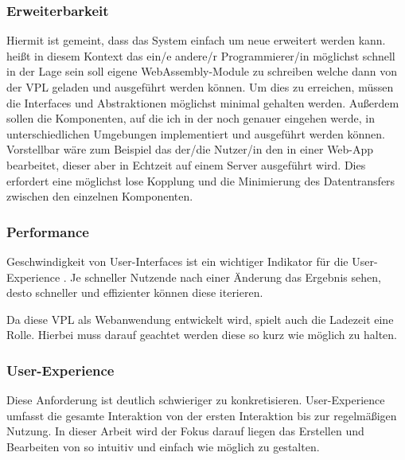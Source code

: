 \documentclass[ngerman]{article}
\begin{document}
\subsubsection{Erweiterbarkeit}

Hiermit ist gemeint, dass das System einfach um neue  erweitert werden kann.
 heißt in diesem Kontext das ein/e andere/r Programmierer/in möglichst 
schnell in der Lage sein soll eigene WebAssembly-Module zu schreiben welche dann von der VPL geladen und ausgeführt werden können.
Um dies zu erreichen, müssen die Interfaces und Abstraktionen möglichst minimal gehalten werden.
\br
Außerdem sollen die Komponenten, auf die ich in der  noch genauer eingehen werde, in unterschiedlichen Umgebungen implementiert und ausgeführt werden können.
Vorstellbar wäre zum Beispiel das der/die Nutzer/in den  in einer Web-App bearbeitet, dieser aber in Echtzeit auf einem Server ausgeführt wird. 
Dies erfordert eine möglichst lose Kopplung und die Minimierung des Datentransfers zwischen den einzelnen Komponenten.

\subsubsection{Performance}

Geschwindigkeit von User-Interfaces ist ein wichtiger Indikator für die User-Experience \cite{6876022}. 
Je schneller Nutzende nach einer Änderung das Ergebnis sehen, desto schneller und effizienter können diese iterieren. 

Da diese VPL als Webanwendung entwickelt wird, spielt auch die Ladezeit eine Rolle. 
Hierbei muss darauf geachtet werden diese so kurz wie möglich zu halten.

\subsubsection{User-Experience}

Diese Anforderung ist deutlich schwieriger zu konkretisieren. User-Experience umfasst die gesamte Interaktion von der ersten Interaktion bis zur regelmäßigen Nutzung. In dieser Arbeit wird der Fokus darauf liegen das Erstellen und Bearbeiten von  so intuitiv und einfach wie möglich zu gestalten.
\end{document}

